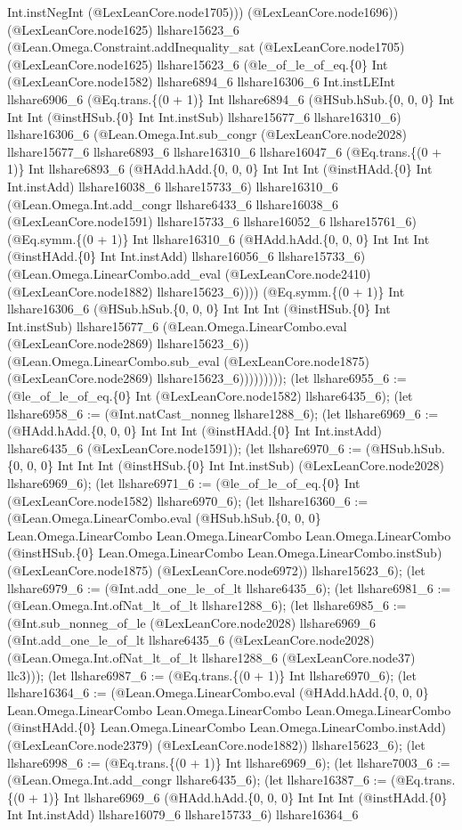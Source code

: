 \documentclass[11pt]{article}
\begin{document}
Int.instNegInt (@LexLeanCore.node1705))) (@LexLeanCore.node1696)) (@LexLeanCore.node1625) llshare15623\_6 (@Lean.Omega.Constraint.addInequality\_sat (@LexLeanCore.node1705) (@LexLeanCore.node1625) llshare15623\_6 (@le\_of\_le\_of\_eq.\{0\} Int (@LexLeanCore.node1582) llshare6894\_6 llshare16306\_6 Int.instLEInt llshare6906\_6 (@Eq.trans.\{(0 + 1)\} Int llshare6894\_6 (@HSub.hSub.\{0, 0, 0\} Int Int Int (@instHSub.\{0\} Int Int.instSub) llshare15677\_6 llshare16310\_6) llshare16306\_6 (@Lean.Omega.Int.sub\_congr (@LexLeanCore.node2028) llshare15677\_6 llshare6893\_6 llshare16310\_6 llshare16047\_6 (@Eq.trans.\{(0 + 1)\} Int llshare6893\_6 (@HAdd.hAdd.\{0, 0, 0\} Int Int Int (@instHAdd.\{0\} Int Int.instAdd) llshare16038\_6 llshare15733\_6) llshare16310\_6 (@Lean.Omega.Int.add\_congr llshare6433\_6 llshare16038\_6 (@LexLeanCore.node1591) llshare15733\_6 llshare16052\_6 llshare15761\_6) (@Eq.symm.\{(0 + 1)\} Int llshare16310\_6 (@HAdd.hAdd.\{0, 0, 0\} Int Int Int (@instHAdd.\{0\} Int Int.instAdd) llshare16056\_6 llshare15733\_6) (@Lean.Omega.LinearCombo.add\_eval (@LexLeanCore.node2410) (@LexLeanCore.node1882) llshare15623\_6)))) (@Eq.symm.\{(0 + 1)\} Int llshare16306\_6 (@HSub.hSub.\{0, 0, 0\} Int Int Int (@instHSub.\{0\} Int Int.instSub) llshare15677\_6 (@Lean.Omega.LinearCombo.eval (@LexLeanCore.node2869) llshare15623\_6)) (@Lean.Omega.LinearCombo.sub\_eval (@LexLeanCore.node1875) (@LexLeanCore.node2869) llshare15623\_6))))))))); (let llshare6955\_6 := (@le\_of\_le\_of\_eq.\{0\} Int (@LexLeanCore.node1582) llshare6435\_6); (let llshare6958\_6 := (@Int.natCast\_nonneg llshare1288\_6); (let llshare6969\_6 := (@HAdd.hAdd.\{0, 0, 0\} Int Int Int (@instHAdd.\{0\} Int Int.instAdd) llshare6435\_6 (@LexLeanCore.node1591)); (let llshare6970\_6 := (@HSub.hSub.\{0, 0, 0\} Int Int Int (@instHSub.\{0\} Int Int.instSub) (@LexLeanCore.node2028) llshare6969\_6); (let llshare6971\_6 := (@le\_of\_le\_of\_eq.\{0\} Int (@LexLeanCore.node1582) llshare6970\_6); (let llshare16360\_6 := (@Lean.Omega.LinearCombo.eval (@HSub.hSub.\{0, 0, 0\} Lean.Omega.LinearCombo Lean.Omega.LinearCombo Lean.Omega.LinearCombo (@instHSub.\{0\} Lean.Omega.LinearCombo Lean.Omega.LinearCombo.instSub) (@LexLeanCore.node1875) (@LexLeanCore.node6972)) llshare15623\_6); (let llshare6979\_6 := (@Int.add\_one\_le\_of\_lt llshare6435\_6); (let llshare6981\_6 := (@Lean.Omega.Int.ofNat\_lt\_of\_lt llshare1288\_6); (let llshare6985\_6 := (@Int.sub\_nonneg\_of\_le (@LexLeanCore.node2028) llshare6969\_6 (@Int.add\_one\_le\_of\_lt llshare6435\_6 (@LexLeanCore.node2028) (@Lean.Omega.Int.ofNat\_lt\_of\_lt llshare1288\_6 (@LexLeanCore.node37) llc3))); (let llshare6987\_6 := (@Eq.trans.\{(0 + 1)\} Int llshare6970\_6); (let llshare16364\_6 := (@Lean.Omega.LinearCombo.eval (@HAdd.hAdd.\{0, 0, 0\} Lean.Omega.LinearCombo Lean.Omega.LinearCombo Lean.Omega.LinearCombo (@instHAdd.\{0\} Lean.Omega.LinearCombo Lean.Omega.LinearCombo.instAdd) (@LexLeanCore.node2379) (@LexLeanCore.node1882)) llshare15623\_6); (let llshare6998\_6 := (@Eq.trans.\{(0 + 1)\} Int llshare6969\_6); (let llshare7003\_6 := (@Lean.Omega.Int.add\_congr llshare6435\_6); (let llshare16387\_6 := (@Eq.trans.\{(0 + 1)\} Int llshare6969\_6 (@HAdd.hAdd.\{0, 0, 0\} Int Int Int (@instHAdd.\{0\} Int Int.instAdd) llshare16079\_6 llshare15733\_6) llshare16364\_6 
\end{document}
